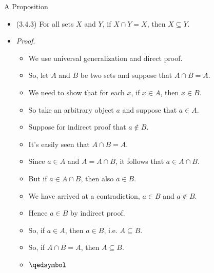 \begin{frame}{A Proposition}

\begin{itemize}

	\item (3.4.3) For all sets $X$ and $Y$, if $X\cap Y=X$, then $X\subseteq Y$.
	
	\item \emph{Proof}.
		\begin{itemize}
		
			\item We use universal generalization and direct proof.
			
			\item So, let $A$ and $B$ be two sets and suppose that $A\cap B=A$.

			\item We need to show that for each $x$, if $x\in A$, then $x\in B$. 
			
			\item So take an arbitrary object $a$ and suppose that $a\in A$. 
			
			\item Suppose for indirect proof that $a\notin B$. 
			
			\item It's easily seen that $A\cap B=A$.
			
			\item Since $a\in A$ and $A=A\cap B$, it follows that $a\in A\cap B$. 
			
			\item But if $a\in A\cap B$, then also $a\in B$. 
			
			\item We have arrived at a contradiction, $a\in B$ and $a\notin B$. 
			
			\item Hence $a\in B$ by indirect proof.
			
			\item  So, if $a\in A$, then $a\in B$, i.e. $A\subseteq B$.
			
			\item  So, if $A\cap B=A$, then $A\subseteq B$.
			
			\item $\qedsymbol$

	\end{itemize}
	
	\end{itemize}

\end{frame}

